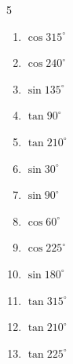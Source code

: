 \begin{multicols}{5}
\begin{enumerate}
  \item $\displaystyle \cos{315^\circ}$


  \item $\displaystyle \cos{240^\circ}$


  \item $\displaystyle \sin{135^\circ}$


  \item $\displaystyle \tan{90^\circ}$

        \phantom{$\displaystyle なし$}

  \item $\displaystyle \tan{210^\circ}$


  \item $\displaystyle \sin{30^\circ}$


  \item $\displaystyle \sin{90^\circ}$

        \phantom{$\displaystyle =1$}

  \item $\displaystyle \cos{60^\circ}$


\columnbreak %

  \item $\displaystyle \cos{225^\circ}$


  \item $\displaystyle \sin{180^\circ}$

        \phantom{$\displaystyle =0$}

  \item $\displaystyle \tan{315^\circ}$

        \phantom{$\displaystyle =-1$}

  \item $\displaystyle \tan{210^\circ}$


  \item $\displaystyle \tan{225^\circ}$


\end{enumerate}
\end{multicols}
